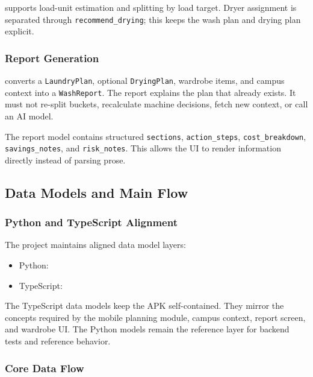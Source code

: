 \documentclass[11pt,a4paper]{article}
\begin{document}
 supports load-unit estimation and splitting by load target. Dryer assignment is separated through \texttt{recommend\_drying}; this keeps the wash plan and drying plan explicit.

\subsubsection{Report Generation}

 converts a \texttt{LaundryPlan}, optional \texttt{DryingPlan}, wardrobe items, and campus context into a \texttt{WashReport}. The report explains the plan that already exists. It must not re-split buckets, recalculate machine decisions, fetch new context, or call an AI model.

The report model contains structured \texttt{sections}, \texttt{action\_steps}, \texttt{cost\_breakdown}, \texttt{savings\_notes}, and \texttt{risk\_notes}. This allows the UI to render information directly instead of parsing prose.

\subsection{Data Models and Main Flow}

\subsubsection{Python and TypeScript Alignment}

The project maintains aligned data model layers:

\begin{itemize}
  \item Python: 
  \item TypeScript: 
\end{itemize}

The TypeScript data models keep the APK self-contained. They mirror the concepts required by the mobile planning module, campus context, report screen, and wardrobe UI. The Python models remain the reference layer for backend tests and reference behavior.

\subsubsection{Core Data Flow}
\end{document}
